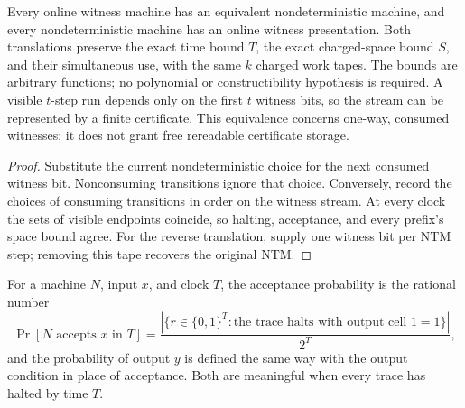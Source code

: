 \begin{theorem}
  \label{thm:models-witness-ntm}
  \leanok
  Every online witness machine has an equivalent nondeterministic machine,
  and every nondeterministic machine has an online witness presentation.
  Both translations preserve the exact time bound $T$, the exact charged-space
  bound $S$, and their simultaneous use, with the same $k$ charged work tapes.
  The bounds are arbitrary functions; no polynomial or constructibility
  hypothesis is required. A visible $t$-step run depends only on the first $t$
  witness bits, so the stream can be represented by a finite certificate.
  This equivalence concerns one-way, consumed witnesses;
  it does not grant free rereadable certificate storage.
\end{theorem}
\begin{proof}
  \leanok
  Substitute the current nondeterministic choice for the next consumed witness
  bit. Nonconsuming transitions ignore that choice. Conversely, record the choices
  of consuming transitions in order on the witness stream. At every clock the
  sets of visible endpoints coincide, so halting, acceptance, and every prefix's
  space bound agree. For the reverse translation, supply one witness bit per NTM
  step; removing this tape recovers the original NTM.
\end{proof}

\begin{definition}
  \label{def:models-accept-prob}
  \leanok
  For a machine $N$, input $x$, and clock $T$, the acceptance probability is the
  rational number
  \[
    \Pr[N \text{ accepts } x \text{ in } T] =
      \frac{|\{ r \in \{0,1\}^T : \text{the trace halts with output cell } 1 = 1\}|}{2^T},
  \]
  and the probability of output $y$ is defined the same way with the output
  condition in place of acceptance. Both are meaningful when every trace has
  halted by time $T$.
\end{definition}

